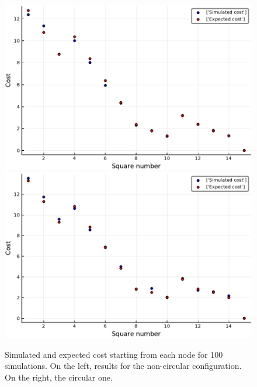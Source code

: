 \begin{figure}[H]
\centering
\includegraphics[scale=0.41]{../img/board_left_high/cost_per_square_100_iter_noncirc.pdf}
\includegraphics[scale=0.41]{../img/board_left_high/cost_per_square_100_iter_circ.pdf}
\caption{Simulated and expected cost starting from each node for 100 simulations. On the left, results for the non-circular configuration. On the right, the circular one.}
\label{fig:cost_per_square_100_iter_left}
\end{figure}

